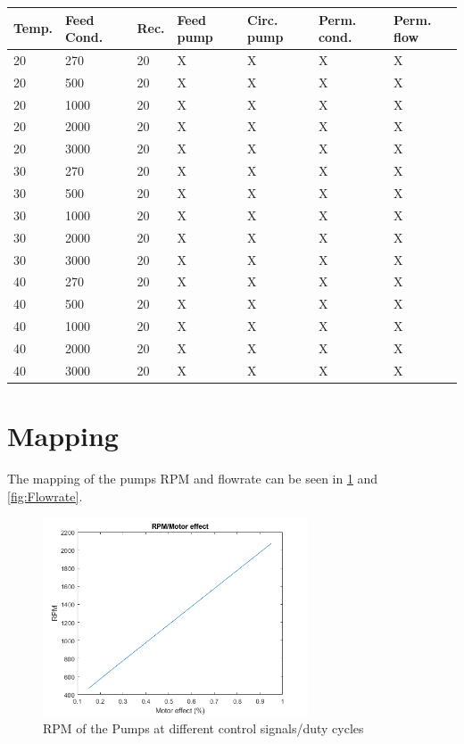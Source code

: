 \begin{center}
    \begin{tabular}{ | p{1cm} |  p{1cm} |  p{1cm} | p{1cm} |p{1cm} |p{1cm} |p{1cm}|}
    \hline
    Temp. & Feed Cond. & Rec.  &  Feed pump & Circ. pump & Perm. cond. & Perm. flow \\ \hline
    20&270&20&X&X&X&X\\
    20&500&20&X&X&X&X\\
    20&1000&20&X&X&X&X\\
    20&2000&20&X&X&X&X\\
    20&3000&20&X&X&X&X\\
    30&270&20&X&X&X&X\\
    30&500&20&X&X&X&X\\
    30&1000&20&X&X&X&X\\
    30&2000&20&X&X&X&X\\
    30&3000&20&X&X&X&X\\
    40&270&20&X&X&X&X\\
    40&500&20&X&X&X&X\\
    40&1000&20&X&X&X&X\\
    40&2000&20&X&X&X&X\\
    40&3000&20&X&X&X&X\\
    \end{tabular}
\end{center}




 
 



 













\section{Mapping}
The mapping of the pumps RPM and flowrate can be seen in \ref{fig:RPM} and \ref{fig:Flowrate}.
\begin{figure}[h]
    \centering
    \includegraphics[width=0.7\textwidth]{RPM.png}
    \caption{RPM of the Pumps at different control signals/duty cycles}
    \label{fig:RPM}
\end{figure}


